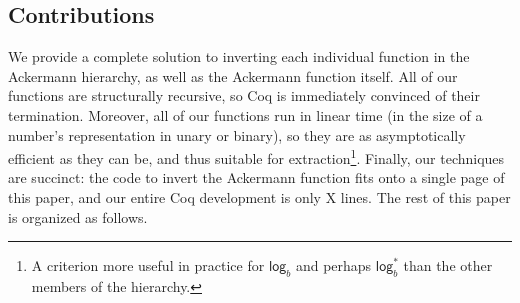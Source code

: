 \subsection{Contributions}
 We provide a complete solution to inverting each individual function in the Ackermann hierarchy,
as well as the Ackermann function itself.  All of our functions are structurally recursive, so
Coq is immediately convinced of their termination.  Moreover, all of our functions run in linear
time (in the size of a number's representation in unary or binary), so they are as asymptotically efficient as they can be, and thus suitable for extraction\footnote{A criterion more useful in practice for $\mathsf{log}_b$ and perhaps $\mathsf{log}^*_b$ than the other members of the hierarchy.}.  Finally, our techniques are succinct: the code to invert the Ackermann function fits onto a single page of this paper, and our entire Coq development is only {\color{red} X} lines. The rest of this paper is organized as follows.
